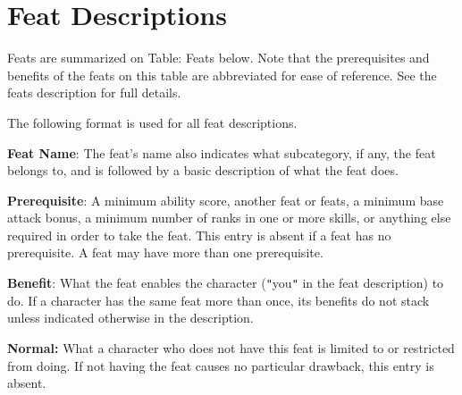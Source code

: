 \section{Feat Descriptions}

				
Feats are summarized on Table: Feats below. Note that the prerequisites and benefits of the feats on this table are abbreviated for ease of reference. See the feats description for full details.
				
The following format is used for all feat descriptions.
				
\textbf{Feat Name}: The feat's name also indicates what subcategory, if any, the feat belongs to, and is followed by a basic description of what the feat does.
				
\textbf{Prerequisite}: A minimum ability score, another feat or feats, a minimum base attack bonus, a minimum number of ranks in one or more skills, or anything else required in order to take the feat. This entry is absent if a feat has no prerequisite. A feat may have more than one prerequisite.
				
\textbf{Benefit}: What the feat enables the character (\texttt{{}"{}}you\texttt{{}"{}} in the feat description) to do. If a character has the same feat more than once, its benefits do not stack unless indicated otherwise in the description.
				
\textbf{Normal:} What a character who does not have this feat is limited to or restricted from doing. If not having the feat causes no particular drawback, this entry is absent.
				
